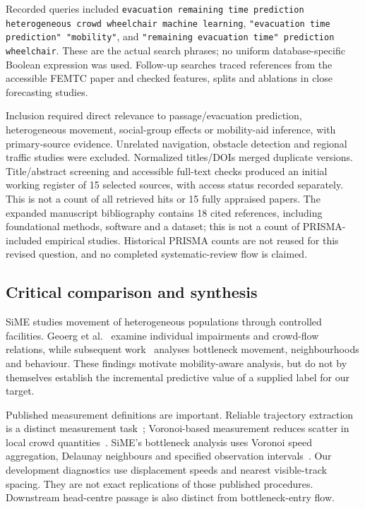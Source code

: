 \documentclass[conference]{IEEEtran}
\begin{document}
Recorded queries included \texttt{evacuation remaining time prediction heterogeneous crowd wheelchair machine learning}, \texttt{"evacuation time prediction" "mobility"}, and \texttt{"remaining evacuation time" prediction wheelchair}. These are the actual search phrases; no uniform database-specific Boolean expression was used. Follow-up searches traced references from the accessible FEMTC paper and checked features, splits and ablations in close forecasting studies.

Inclusion required direct relevance to passage/evacuation prediction, heterogeneous movement, social-group effects or mobility-aid inference, with primary-source evidence. Unrelated navigation, obstacle detection and regional traffic studies were excluded. Normalized titles/DOIs merged duplicate versions. Title/abstract screening and accessible full-text checks produced an initial working register of 15 selected sources, with access status recorded separately. This is not a count of all retrieved hits or 15 fully appraised papers. The expanded manuscript bibliography contains 18 cited references, including foundational methods, software and a dataset; this is not a count of PRISMA-included empirical studies. Historical PRISMA counts are not reused for this revised question, and no completed systematic-review flow is claimed.

\subsection{Critical comparison and synthesis}
SiME studies movement of heterogeneous populations through controlled facilities. Geoerg et al.~\cite{geoerg} examine individual impairments and crowd-flow relations, while subsequent work~\cite{sime} analyses bottleneck movement, neighbourhoods and behaviour. These findings motivate mobility-aware analysis, but do not by themselves establish the incremental predictive value of a supplied label for our target.

Published measurement definitions are important. Reliable trajectory extraction is a distinct measurement task~\cite{boltes}; Voronoi-based measurement reduces scatter in local crowd quantities~\cite{steffen}. SiME's bottleneck analysis uses Voronoi speed aggregation, Delaunay neighbours and specified observation intervals~\cite{sime}. Our development diagnostics use displacement speeds and nearest visible-track spacing. They are not exact replications of those published procedures. Downstream head-centre passage is also distinct from bottleneck-entry flow.
\end{document}
